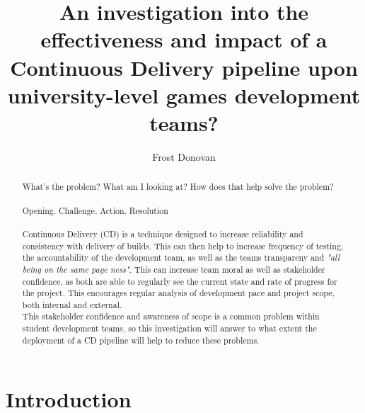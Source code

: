 \documentclass[lettersize,journal]{IEEEtran}
\begin{document}
\title{An investigation into the effectiveness and impact of a Continuous Delivery pipeline upon university-level games development teams?}

\author{Frost Donovan}

\maketitle

\begin{abstract}
    What's the problem? What am I looking at? How does that help solve the problem? \\
    \\
    Opening, Challenge, Action, Resolution \\
    \\
    Continuous Delivery (CD) is a technique designed to increase reliability and consistency with delivery of builds. This can then help to increase frequency of testing, the accountability of the development team, as well as the teams transpareny and \textit{"all being on the same page ness"}. This can increase team moral as well as stakeholder confidence, as both are able to regularly see the current state and rate of progress for the project. This encourages regular analysis of development pace and project scope, both internal and external. \\
    This stakeholder confidence and awareness of scope is a common problem within student development teams, so this investigation will answer to what extent the deployment of a CD pipeline will help to reduce these problems.
\end{abstract}

\section{Introduction}
\end{document}
